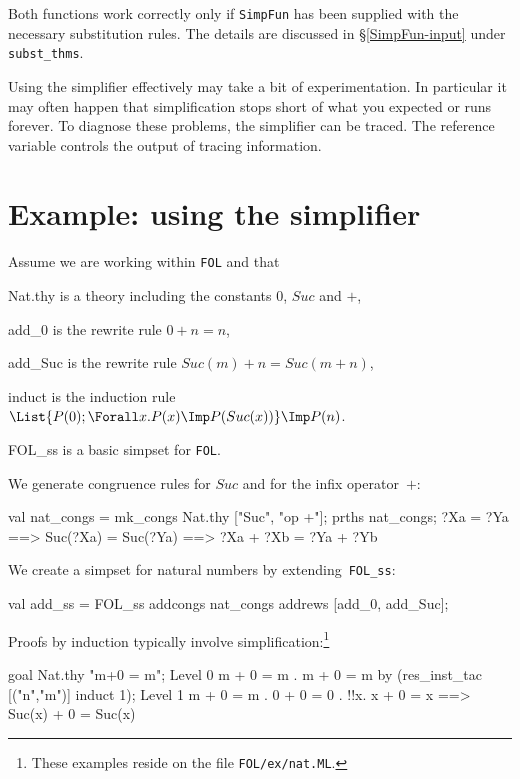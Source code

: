 Both functions work correctly only if {\tt SimpFun} has been supplied with the
necessary substitution rules.  The details are discussed in
\S\ref{SimpFun-input} under {\tt subst_thms}.
\begin{warn}
Using the simplifier effectively may take a bit of experimentation. In
particular it may often happen that simplification stops short of what you
expected or runs forever. To diagnose these problems, the simplifier can be
traced. The reference variable  controls the output of
tracing information.
\end{warn}


\section{Example: using the simplifier}
Assume we are working within {\tt FOL} and that
\begin{ttdescription}
\item[Nat.thy] is a theory including the constants $0$, $Suc$ and $+$,
\item[add_0] is the rewrite rule $0+n = n$,
\item[add_Suc] is the rewrite rule $Suc(m)+n = Suc(m+n)$,
\item[induct] is the induction rule
$\List{P(0); \Forall x. P(x)\Imp P(Suc(x))} \Imp P(n)$.
\item[FOL_ss] is a basic simpset for {\tt FOL}.
\end{ttdescription}
We generate congruence rules for $Suc$ and for the infix operator~$+$:
\begin{ttbox}
val nat_congs = mk_congs Nat.thy ["Suc", "op +"];
prths nat_congs;
{\out ?Xa = ?Ya ==> Suc(?Xa) = Suc(?Ya)}
{\out [| ?Xa = ?Ya; ?Xb = ?Yb |] ==> ?Xa + ?Xb = ?Ya + ?Yb}
\end{ttbox}
We create a simpset for natural numbers by extending~{\tt FOL_ss}:
\begin{ttbox}
val add_ss = FOL_ss  addcongs nat_congs  
                     addrews  [add_0, add_Suc];
\end{ttbox}
Proofs by induction typically involve simplification:\footnote
{These examples reside on the file {\tt FOL/ex/nat.ML}.} 
\begin{ttbox}
goal Nat.thy "m+0 = m";
{\out Level 0}
{\out m + 0 = m}
{. m + 0 = m}
\ttbreak
by (res_inst_tac [("n","m")] induct 1);
{\out Level 1}
{\out m + 0 = m}
{. 0 + 0 = 0}
{. !!x. x + 0 = x ==> Suc(x) + 0 = Suc(x)}
\end{ttbox}
